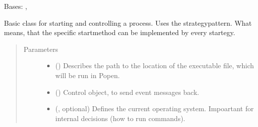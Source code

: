 \documentclass[letterpaper,10pt,english]{sphinxmanual}
\begin{document}
\begin{fulllineitems}
\label{\detokenize{anoog.automation:anoog.automation.py_exe_interface.Process_Interface}}
\sphinxAtStartPar
Bases: , {\hyperref[\detokenize{anoog.automation:anoog.automation.event.Eventsystem_Component}]{}}

\sphinxAtStartPar
Basic class for starting and controlling a process.
Uses the strategy\sphinxhyphen{}pattern. What means, that the specific start\sphinxhyphen{}method can be implemented by every startegy.
\begin{quote}\begin{description}
\item[{Parameters}] \leavevmode\begin{itemize}
\item {} 
\sphinxAtStartPar
{} () \textendash{} Describes the path to the location of the executable file, which will be run in Popen.

\item {} 
\sphinxAtStartPar
{} ({\hyperref[\detokenize{anoog.automation:anoog.automation.controller.Terminal}]{}}) \textendash{} Control object, to send event messages back.

\item {} 
\sphinxAtStartPar
{} ({\hyperref[\detokenize{anoog.automation:anoog.automation.py_exe_interface.op}]{}}, optional) \textendash{} Defines the current operating system. Impoartant for internal decisions (how to run commands).

\end{itemize}

\end{description}\end{quote}


\end{fulllineitems}
\end{document}
